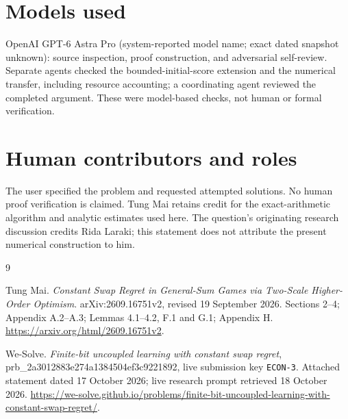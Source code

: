 \documentclass[11pt]{article}
\begin{document}
\section*{Models used}
OpenAI GPT-6 Astra Pro (system-reported model name; exact dated snapshot
unknown): source inspection, proof construction, and adversarial
self-review.  Separate agents checked the bounded-initial-score
extension and the numerical transfer, including resource accounting;
a coordinating agent reviewed the completed argument.  These were
model-based checks, not human or formal verification.

\section*{Human contributors and roles}
The user specified the problem and requested attempted solutions.
No human proof verification is claimed.  Tung Mai retains credit for
the exact-arithmetic algorithm and analytic estimates used here.
The question's originating research discussion credits Rida Laraki;
this statement does not attribute the present numerical construction
to him.

\begin{thebibliography}{9}
\raggedright
{}
Tung Mai.
\emph{Constant Swap Regret in General-Sum Games via Two-Scale Higher-Order
Optimism}.  arXiv:2609.16751v2, revised 19 September 2026.
Sections 2--4; Appendix A.2--A.3; Lemmas 4.1--4.2, F.1 and G.1;
Appendix H.
\url{https://arxiv.org/html/2609.16751v2}.

We-Solve.
\emph{Finite-bit uncoupled learning with constant swap regret},
prb_2a3012883e274a1384504ef3c9221892, live submission key \texttt{ECON-3}.
Attached statement dated 17 October 2026; live research prompt
retrieved 18 October 2026.
\url{https://we-solve.github.io/problems/finite-bit-uncoupled-learning-with-constant-swap-regret/}.
\end{thebibliography}
\end{document}
